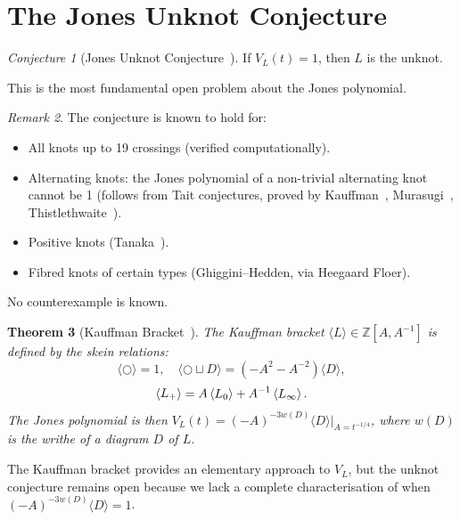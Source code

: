 \documentclass[12pt,a4paper]{amsart}
\newtheorem{theorem}{Theorem}[section]
\theoremstyle{definition}
\theoremstyle{remark}
\newtheorem{remark}[theorem]{Remark}
\newtheorem{conjecture}[theorem]{Conjecture}
\newcommand{\Z}{\mathbb{Z}}
\begin{document}
\section{The Jones Unknot Conjecture}

\begin{conjecture}[Jones Unknot Conjecture~\cite{Jones1985}]
\label{conj:Jones}
If $V_L(t) = 1$, then $L$ is the unknot.
\end{conjecture}

This is the most fundamental open problem about the Jones polynomial.

\begin{remark}
The conjecture is known to hold for:
\begin{itemize}
\item All knots up to 19 crossings (verified computationally).
\item Alternating knots: the Jones polynomial of a non-trivial alternating
      knot cannot be 1 (follows from Tait conjectures, proved by
      Kauffman~\cite{Kauffman1987}, Murasugi~\cite{Murasugi1987},
      Thistlethwaite~\cite{Thistlethwaite1987}).
\item Positive knots (Tanaka~\cite{Tanaka1996}).
\item Fibred knots of certain types (Ghiggini--Hedden, via Heegaard Floer).
\end{itemize}
No counterexample is known.
\end{remark}

\begin{theorem}[Kauffman Bracket~\cite{Kauffman1987}]
\label{thm:Kauffman}
The \emph{Kauffman bracket} $\langle L \rangle \in \Z[A, A^{-1}]$ is defined
by the skein relations:
\[
    \langle \bigcirc \rangle = 1, \quad
    \langle \bigcirc \sqcup D \rangle = (-A^2 - A^{-2})\langle D \rangle,
\]
\[
    \left\langle \vcenter{\hbox{$L_+$}} \right\rangle =
    A \left\langle \vcenter{\hbox{$L_0$}} \right\rangle +
    A^{-1} \left\langle \vcenter{\hbox{$L_\infty$}} \right\rangle.
\]
The Jones polynomial is then
$V_L(t) = (-A)^{-3w(D)} \langle D \rangle \big|_{A = t^{-1/4}}$,
where $w(D)$ is the writhe of a diagram $D$ of $L$.
\end{theorem}

The Kauffman bracket provides an elementary approach to $V_L$, but the
unknot conjecture remains open because we lack a complete characterisation
of when $(-A)^{-3w(D)}\langle D \rangle = 1$.
\end{document}
